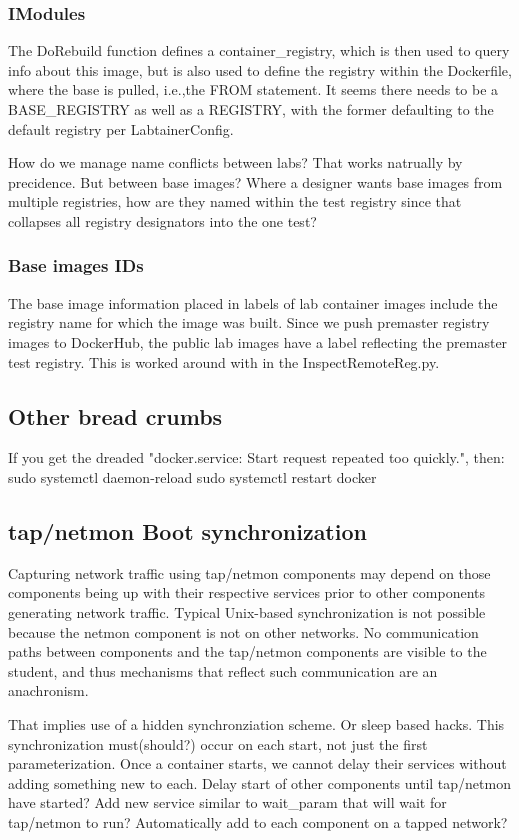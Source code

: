 \documentclass[12pt]{article}
\begin{document}
\subsubsection {IModules}
The DoRebuild function defines a container\_registry, which is then used to query info about this image, but is also used to define the
registry within the Dockerfile, where the base is pulled, i.e.,the FROM statement.  It seems there needs to be a BASE\_REGISTRY as well as
a REGISTRY, with the former defaulting to the default registry per LabtainerConfig.

How do we manage name conflicts between labs?  That works natrually by precidence.  But between base images?  Where a designer wants base
images from multiple registries, how are they named within the test registry since that collapses all registry designators into the one test?

\subsubsection {Base images IDs}
The base image information placed in labels of lab container images include the registry name for which the image was built.  Since we push
premaster registry images to DockerHub, the public lab images have a label reflecting the premaster test registry.
This is worked around with in the InspectRemoteReg.py.  

\subsection{Other bread crumbs}
If you get the dreaded "docker.service: Start request repeated too quickly.", then:
sudo systemctl daemon-reload
sudo systemctl restart docker

\subsection{tap/netmon Boot synchronization}
Capturing network traffic using tap/netmon components may depend on those components being up with their respective
services prior to other components generating network traffic.  Typical Unix-based synchronization is not possible
because the netmon component is not on other networks.  No communication paths between components and the tap/netmon
components are visible to the student, and thus mechanisms that reflect such communication are an anachronism.

That implies use of a hidden synchronziation scheme.  Or sleep based hacks.  This synchronization must(should?) occur on 
each start, not just the first parameterization.  Once a container starts, we cannot delay their services without adding
something new to each.
Delay start of other components until tap/netmon have started?
Add new service similar to wait\_param that will wait for tap/netmon to run?  Automatically add to each component
on a tapped network?
\end{document}
